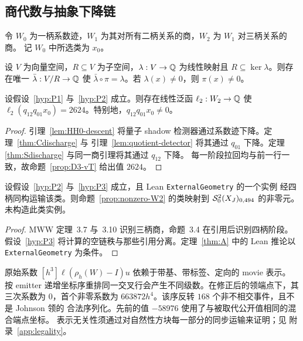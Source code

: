 \subsection{商代数与抽象下降链}

令 $W_0$ 为一柄系数迹，$W_1$ 为其对所有二柄关系的商，$W_2$ 为 $W_1$ 对三柄关系的商。
记 $W_0$ 中所选类为 $x_0$。

\begin{lemma}[线性检测器在商中存活]\label{lem:quotient-detector}
设 $V$ 为向量空间，$R\subseteq V$ 为子空间，$\lambda:V\to\mathbb{Q}$ 为线性映射且
$R\subseteq\ker\lambda$。则存在唯一 $\bar\lambda:V/R\to\mathbb{Q}$ 使
$\bar\lambda\circ\pi=\lambda$。若 $\lambda(x)\ne0$，则 $\pi(x)\ne0$。
\end{lemma}

\begin{proposition}[商后抽象非零类]\label{prop:nonzero-W2}
设假设~\ref{hyp:P1} 与~\ref{hyp:P2} 成立。则存在线性泛函 $\ell_2:W_2\to\mathbb{Q}$ 使
$\ell_2(q_{12}q_{01}x_0)=2624$。特别地，$q_{12}q_{01}x_0\ne0$。
\end{proposition}

\begin{proof}
引理~\ref{lem:HH0-descent} 将量子 shadow 检测器通过系数迹下降。定理~\ref{thm:Cdischarge} 与
引理~\ref{lem:quotient-detector} 将其通过 $q_{01}$ 下降。定理
\ref{thm:Sdischarge} 与同一商引理将其通过 $q_{12}$ 下降。
每一阶段拉回均与前一行一致，故命题~\ref{prop:D3-vT} 给出值 $2624$。
\end{proof}

\begin{proposition}[闭候选类]\label{prop:closed-class}
设假设~\ref{hyp:P2} 与~\ref{hyp:P3} 成立，且 Lean \texttt{ExternalGeometry} 的一个实例
经四柄同构运输该类。则命题~\ref{prop:nonzero-W2} 的类映射到
$\mathcal{S}^{2}_{0}(X_J)_{0,494}$ 的非零元。未构造此类实例。
\end{proposition}

\begin{proof}
MWW 定理~3.7 与~3.10 识别三柄商，命题~3.4 在引用后识别四柄阶段。
假设~\ref{hyp:P3} 将计算的空链秩与那些引用分离。定理~\ref{thm:A} 中的 Lean 推论以
\texttt{ExternalGeometry} 为条件。
\end{proof}

\begin{remark}[表示与序列化依赖]\label{rem:serialization}
原始系数 $[h^3]\ell(\rho_h(W)-I)u$ 依赖于带基、带标签、定向的 movie 表示。
按 emitter 递增坐标序重排同一交叉行会产生不同级数。在修正后的领端点下，其三次系数为
$0$，首个非零系数为 $663872h^4$。该序反转 $168$ 个非不相交事件，且不是 Johnson 领的
合法序列化。先前的值 $-58976$ 使用了与被取代公开值相同的混合端点坐标。
表示无关性须通过对自然性方块每一部分的同步运输来证明；见
附录~\ref{app:legality}。
\end{remark}

